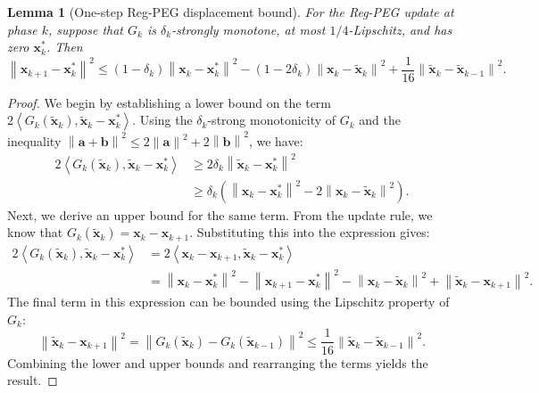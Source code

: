 \documentclass[letterpaper,11pt]{article}
\newcommand{\norm}[1]{\left\| #1 \right\|}
\newcommand{\angles}[1]{\left\langle #1 \right \rangle}
\newcommand{\vect}[1]{\mathbf{#1}}
\newtheorem{lemma}{Lemma}
\begin{document}
\begin{lemma}[One-step Reg-PEG displacement bound]\label{lem:omd-dis-contract}
For the Reg-PEG update at phase \(k\), suppose that \(G_k\) is \(\delta_k\)-strongly monotone, at most \(1/4\)-Lipschitz, and has zero \(\vect{x}_k^*\). Then
\[
\norm{\vect{x}_{k+1} - \vect{x}_k^*}^2 \le (1 - \delta_k)\norm{\vect{x}_k - \vect{x}_k^*}^2 - (1-2\delta_k)\norm{\vect{x}_k - \tilde{\vect{x}}_k}^2 + \frac{1}{16}\norm{\tilde{\vect{x}}_k - \tilde{\vect{x}}_{k-1}}^2.
\]
\end{lemma}
\begin{proof}
We begin by establishing a lower bound on the term $2 \angles{G_k(\tilde{\vect{x}}_k), \tilde{\vect{x}}_k - \vect{x}_k^*}$. Using the $\delta_k$-strong monotonicity of $G_k$ and the inequality $\norm{\vect{a}+\vect{b}}^2 \le 2\norm{\vect{a}}^2 + 2\norm{\vect{b}}^2$, we have:
\begin{align*}
2 \angles{G_k(\tilde{\vect{x}}_k), \tilde{\vect{x}}_k - \vect{x}_k^*} &\ge 2\delta_k\norm{\tilde{\vect{x}}_k-\vect{x}_k^*}^2 \\
&\ge \delta_k\left(\norm{\vect{x}_k-\vect{x}_k^*}^2 - 2\norm{\vect{x}_k-\tilde{\vect{x}}_k}^2\right).
\end{align*}
Next, we derive an upper bound for the same term. From the update rule, we know that $G_k(\tilde{\vect{x}}_k) = \vect{x}_k - \vect{x}_{k+1}$. Substituting this into the expression gives:
\begin{align*}
2 \angles{G_k(\tilde{\vect{x}}_k), \tilde{\vect{x}}_k - \vect{x}_k^*} &= 2\angles{\vect{x}_k-\vect{x}_{k+1}, \tilde{\vect{x}}_k-\vect{x}_k^*} \\
&= \norm{\vect{x}_k - \vect{x}_k^*}^2 - \norm{\vect{x}_{k+1} - \vect{x}_k^*}^2 - \norm{\vect{x}_k - \tilde{\vect{x}}_k}^2 + \norm{\tilde{\vect{x}}_k - \vect{x}_{k+1}}^2.
\end{align*}
The final term in this expression can be bounded using the Lipschitz property of \(G_k\):
\[
\norm{\tilde{\vect{x}}_k - \vect{x}_{k+1}}^2 = \norm{G_k(\tilde{\vect{x}}_k) - G_k(\tilde{\vect{x}}_{k-1})}^2 \le \frac{1}{16} \norm{\tilde{\vect{x}}_k - \tilde{\vect{x}}_{k-1}}^2.
\]
Combining the lower and upper bounds and rearranging the terms yields the result.
\end{proof}
\end{document}
